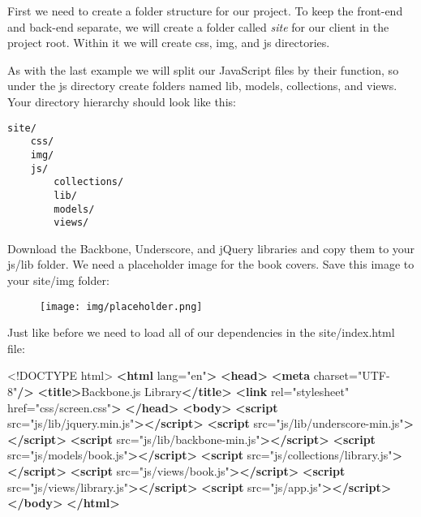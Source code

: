 \documentclass[9pt]{book}
\newenvironment{Shaded}{}{}
\newcommand{\KeywordTok}[1]{\textcolor[rgb]{0.00,0.44,0.13}{\textbf{{#1}}}}
\newcommand{\DataTypeTok}[1]{\textcolor[rgb]{0.56,0.13,0.00}{{#1}}}
\newcommand{\StringTok}[1]{\textcolor[rgb]{0.25,0.44,0.63}{{#1}}}
\newcommand{\OtherTok}[1]{\textcolor[rgb]{0.00,0.44,0.13}{{#1}}}
\newcommand{\NormalTok}[1]{{#1}}
\begin{document}
First we need to create a folder structure for our project. To keep the
front-end and back-end separate, we will create a folder called
\emph{site} for our client in the project root. Within it we will create
css, img, and js directories.

As with the last example we will split our JavaScript files by their
function, so under the js directory create folders named lib, models,
collections, and views. Your directory hierarchy should look like this:

\begin{verbatim}
site/
    css/
    img/
    js/
        collections/
        lib/
        models/
        views/
\end{verbatim}

Download the Backbone, Underscore, and jQuery libraries and copy them to
your js/lib folder. We need a placeholder image for the book covers.
Save this image to your site/img folder:

\begin{figure}[htbp]
\centering
\texttt{[image: img/placeholder.png]}
\end{figure}

Just like before we need to load all of our dependencies in the
site/index.html file:

\begin{Shaded}
\begin{Highlighting}[]
\DataTypeTok{<!DOCTYPE }\NormalTok{html}\DataTypeTok{>}
\KeywordTok{<html}\OtherTok{ lang=}\StringTok{"en"}\KeywordTok{>}
    \KeywordTok{<head>}
        \KeywordTok{<meta}\OtherTok{ charset=}\StringTok{"UTF-8"}\KeywordTok{/>}
        \KeywordTok{<title>}\NormalTok{Backbone.js Library}\KeywordTok{</title>}
        \KeywordTok{<link}\OtherTok{ rel=}\StringTok{"stylesheet"}\OtherTok{ href=}\StringTok{"css/screen.css"}\KeywordTok{>}
    \KeywordTok{</head>}
    \KeywordTok{<body>}
        \KeywordTok{<script}\OtherTok{ src=}\StringTok{"js/lib/jquery.min.js"}\KeywordTok{></script>}
        \KeywordTok{<script}\OtherTok{ src=}\StringTok{"js/lib/underscore-min.js"}\KeywordTok{></script>}
        \KeywordTok{<script}\OtherTok{ src=}\StringTok{"js/lib/backbone-min.js"}\KeywordTok{></script>}
        \KeywordTok{<script}\OtherTok{ src=}\StringTok{"js/models/book.js"}\KeywordTok{></script>}
        \KeywordTok{<script}\OtherTok{ src=}\StringTok{"js/collections/library.js"}\KeywordTok{></script>}
        \KeywordTok{<script}\OtherTok{ src=}\StringTok{"js/views/book.js"}\KeywordTok{></script>}
        \KeywordTok{<script}\OtherTok{ src=}\StringTok{"js/views/library.js"}\KeywordTok{></script>}
        \KeywordTok{<script}\OtherTok{ src=}\StringTok{"js/app.js"}\KeywordTok{></script>}
    \KeywordTok{</body>}
\KeywordTok{</html>}
\end{Highlighting}
\end{Shaded}
\end{document}
